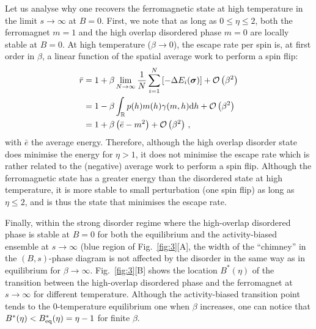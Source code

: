 \documentclass{iopart}
\newcommand{\dst}[0]{\ensuremath{\mathrm{d}}}
\begin{document}
Let us analyse why one recovers the ferromagnetic state at high temperature in the limit $s\to \infty$ at $B=0$.
First, we note that as long as $0 \leqslant \eta\leqslant 2$, both the ferromagnet $m=1$ and the high overlap disordered phase $m=0$ are locally stable at $B=0$.
At high temperature ($\beta \to 0$), the escape rate per spin is, at first order in $\beta$, a linear function of the spatial average work to perform a spin flip:
\begin{align}
  \label{eq:17}
  \bar{r} &= 1 + \beta \lim_{N\to\infty}\frac{1}{N}\sum_{i=1}^{N} \left[-\Delta E_{i}(\bm{\sigma})\right] + \mathcal{O}\left(\beta^{2}\right) \\
          & = 1 - \beta \int_{\mathbb{R}}p(h) m(h) \gamma(m,h) \dst h   + \mathcal{O}\left(\beta^{2}\right) \notag \\
          & = 1 + \beta\left(\bar{e} - m^{2}\right)  + \mathcal{O}\left(\beta^{2}\right) \, ,
\end{align}
with $\bar{e}$ the average energy.
Therefore, although the high overlap disorder state does minimise the energy for $\eta > 1$, it does not minimise the escape rate which is rather related to the (negative) average work to perform a spin flip.
Although the ferromagnetic state has a greater energy than the disordered state at high temperature, it is more stable to small perturbation (one spin flip) as long as $\eta \leqslant 2$, and is thus the state that minimises the escape rate.

Finally, within the strong disorder regime where the high-overlap disordered phase is stable at $B=0$ for both the equilibrium and the activity-biased ensemble at $s\to \infty$ (blue region of Fig.~\ref{fig:3}[A], the width of the ``chimney'' in the $(B,s)$-phase diagram is not affected by the disorder in the same way as in equilibrium for $\beta \to \infty$. Fig.~\ref{fig:3}[B] shows the location $B^{\ast}(\eta)$ of the transition between the high-overlap disordered phase and the ferromagnet at $s\to\infty$ for different temperature. Although the activity-biased transition point tends to the $0$-temperature equilibrium one when $\beta$ increases, one can notice that $B^{\ast}(\eta)<B_{\rm eq}^{\ast}(\eta)=\eta - 1$ for finite $\beta$.

\end{document}
